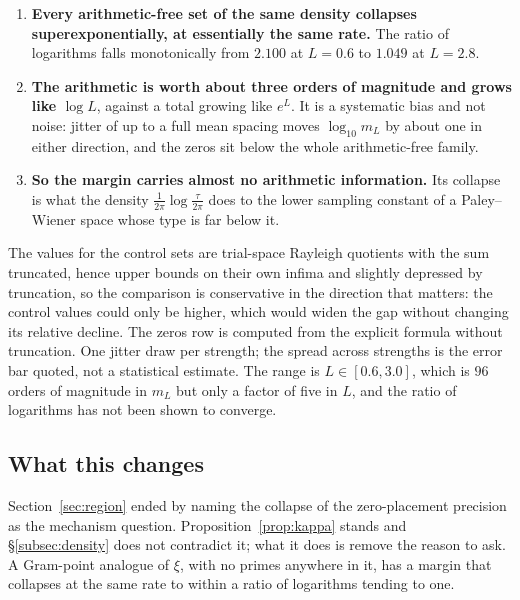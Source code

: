 \begin{enumerate}
\item \textbf{Every arithmetic-free set of the same density collapses
superexponentially, at essentially the same rate.} The ratio of logarithms falls
monotonically from $2.100$ at $L=0.6$ to $1.049$ at $L=2.8$.
\item \textbf{The arithmetic is worth about three orders of magnitude and grows
like $\log L$}, against a total growing like $e^L$. It is a systematic bias and not
noise: jitter of up to a full mean spacing moves $\log_{10}m_L$ by about one in
either direction, and the zeros sit below the whole arithmetic-free family.
\item \textbf{So the margin carries almost no arithmetic information.} Its collapse
is what the density $\frac1{2\pi}\log\frac\tau{2\pi}$ does to the lower sampling
constant of a Paley--Wiener space whose type is far below it.
\end{enumerate}

\begin{remark}\label{rem:densityscope}
The values for the control sets are trial-space Rayleigh quotients with the sum
truncated, hence upper bounds on their own infima and slightly depressed by
truncation, so the comparison is conservative in the direction that matters: the
control values could only be higher, which would widen the gap without changing
its relative decline. The zeros row is computed from the explicit formula without
truncation. One jitter draw per strength; the spread across strengths is the error
bar quoted, not a statistical estimate. The range is $L\in[0.6,3.0]$, which is
$96$ orders of magnitude in $m_L$ but only a factor of five in $L$, and the ratio
of logarithms has not been shown to converge.
\end{remark}

\subsection{What this changes}

Section~\ref{sec:region} ended by naming the collapse of the zero-placement
precision as the mechanism question. Proposition~\ref{prop:kappa} stands and
\S\ref{subsec:density} does not contradict it; what it does is remove the reason to
ask. A Gram-point analogue of $\xi$, with no primes anywhere in it, has a margin
that collapses at the same rate to within a ratio of logarithms tending to one.

